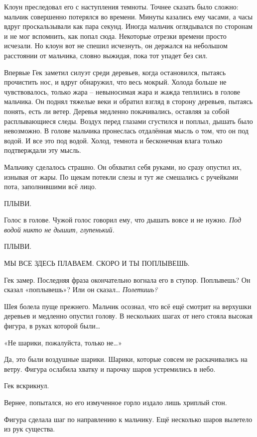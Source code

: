 \documentclass[
  a5paperpaper,
  DIV=11,
  numbers=noendperiod]{scrreprt}
\begin{document}
Клоун преследовал его с наступления темноты. Точнее сказать было сложно:
мальчик совершенно потерялся во времени. Минуты казались ему часами, а
часы вдруг проскальзывали как пара секунд. Иногда мальчик оглядывался по
сторонам и не мог вспомнить, как попал сюда. Некоторые отрезки времени
просто исчезали. Но клоун вот не спешил исчезнуть, он держался на
небольшом расстоянии от мальчика, словно выжидая, пока тот упадет без
сил.

Впервые Гек заметил силуэт среди деревьев, когда остановился, пытаясь
прочистить нос, и вдруг обнаружил, что весь мокрый. Холода больше не
чувствовалось, только жара -- невыносимая жара и жажда теплились в
голове мальчика. Он поднял тяжелые веки и обратил взгляд в сторону
деревьев, пытаясь понять, есть ли ветер. Деревья медленно покачивались,
оставляя за собой расплывающиеся следы. Воздух перед глазами сгустился и
поплыл, дышать было невозможно. В голове мальчика пронеслась отдалённая
мысль о том, что он под водой. И все это под водой. Холод, темнота и
бесконечная влага только подтверждали эту мысль.

Мальчику сделалось страшно. Он обхватил себя руками, но сразу опустил
их, изнывая от жары. По щекам потекли слезы и тут же смешались с
ручейками пота, заполнившими всё лицо.

ПЛЫВИ.

Голос в голове. Чужой голос говорил ему, что дышать вовсе и не нужно.
\emph{Под водой никто не дышит, глупенький.}

ПЛЫВИ.

МЫ ВСЕ ЗДЕСЬ ПЛАВАЕМ. СКОРО И ТЫ ПОПЛЫВЕШЬ.

Гек замер. Последняя фраза окончательно вогнала его в ступор. Поплывешь?
Он сказал «поплывешь»? Или он сказал\ldots{} \emph{Полетишь?}

Шея болела пуще прежнего. Мальчик осознал, что всё ещё смотрит на
верхушки деревьев и медленно опустил голову. В нескольких шагах от него
стояла высокая фигура, в руках которой были\ldots{}

«Не шарики, пожалуйста, только не\ldots»

Да, это были воздушные шарики. Шарики, которые совсем не раскачивались
на ветру. Фигура ослабила хватку и парочку шаров устремились в небо.

Гек вскрикнул.

Вернее, попытался, но его измученное горло издало лишь хриплый стон.

Фигура сделала шаг по направлению к мальчику. Ещё несколько шаров
вылетело из рук существа.
\end{document}
